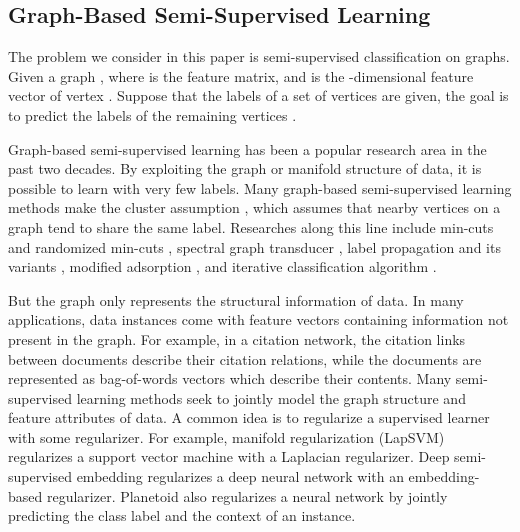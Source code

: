 \documentclass[letterpaper]{article} \usepackage{aaai18}  \usepackage{times}  \usepackage{helvet}  \usepackage{courier}  \usepackage{url}  \usepackage{graphicx}  \usepackage{algorithm}
\begin{document}
\subsection{Graph-Based Semi-Supervised Learning}

The problem we consider in this paper is semi-supervised classification on graphs. Given a graph , where  is the feature matrix, and  is the -dimensional feature vector of vertex . Suppose that the labels of a set of vertices  are given, the goal is to predict the labels of the remaining vertices .


Graph-based semi-supervised learning has been a popular research area in the past two decades. By exploiting the graph or manifold structure of data, it is possible to learn with very few labels. Many graph-based semi-supervised learning methods make the cluster assumption \cite{chapelle2005semi}, which assumes that nearby vertices on a graph tend to share the same label. Researches along this line include min-cuts \cite{blum2001learning} and randomized min-cuts \cite{blum2004semi}, spectral graph transducer \cite{joachims2003transductive}, label propagation \cite{Zhu03} and its variants \cite{Zhou03,bengio2006label}, modified adsorption \cite{talukdar2009new}, and iterative classification algorithm \cite{sen2008collective}.





But the graph only represents the structural information of data. In many applications, data instances come with feature vectors containing information not present in the graph. For example, in a citation network, the citation links between documents describe their citation relations, while the documents are represented as bag-of-words vectors which describe their contents. Many semi-supervised learning methods seek to jointly model the graph structure and feature attributes of data. A common idea is to regularize a supervised learner with some regularizer. For example, manifold regularization (LapSVM) \cite{belkin2006manifold} regularizes a support vector machine with a Laplacian regularizer. Deep semi-supervised embedding \cite{weston2012deep} regularizes a deep neural network with an embedding-based regularizer. Planetoid \cite{yang2016revisiting} also regularizes a neural network by jointly predicting the class label and the context of an instance.
\end{document}
